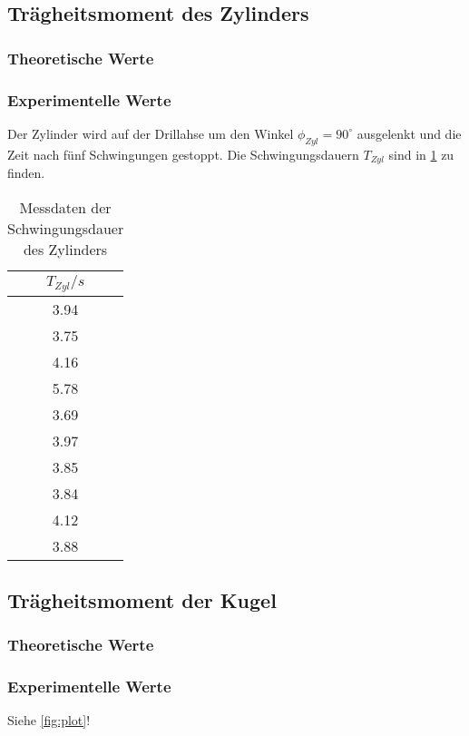 \subsection{Trägheitsmoment des Zylinders}
\subsubsection{Theoretische Werte}

\subsubsection{Experimentelle Werte}
Der Zylinder wird auf der Drillahse um den Winkel $\phi_{Zyl} = 90^{\circ}$ ausgelenkt und die Zeit
nach fünf Schwingungen gestoppt. Die Schwingungsdauern $T_{Zyl}$ sind in \ref{tab:T_Zyl} zu finden.
\begin{table}
  \centering
  \caption{Messdaten der Schwingungsdauer des Zylinders}
  \label{tab:T_Zyl}
  \begin{tabular}{c}
    \toprule
    $T_{Zyl}/s$ \\
    \midrule
    3.94 \\
    3.75 \\
    4.16 \\
    5.78 \\
    3.69 \\
    3.97 \\
    3.85 \\
    3.84 \\
    4.12 \\
    3.88 \\
    \bottomrule
  \end{tabular}
\end{table}

\subsection{Trägheitsmoment der Kugel}
\subsubsection{Theoretische Werte}

\subsubsection{Experimentelle Werte}


Siehe \autoref{fig:plot}!
